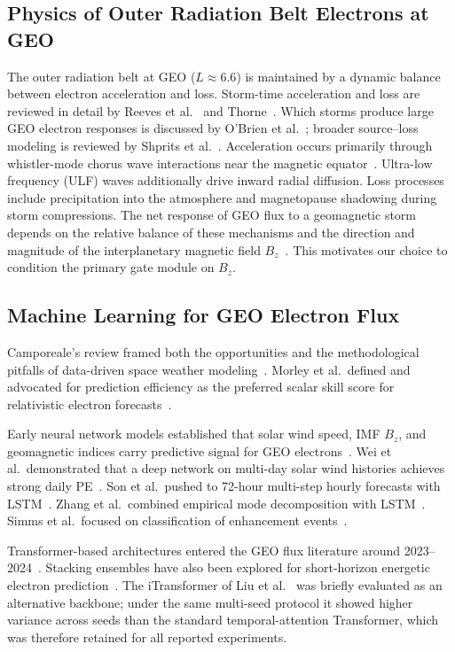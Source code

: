 ﻿\documentclass{ieeeaccess}
\begin{document}
\subsection{Physics of Outer Radiation Belt Electrons at GEO}
The outer radiation belt at GEO (\(L\approx6.6\)) is maintained by a dynamic
balance between electron acceleration and loss. Storm-time acceleration and loss
are reviewed in detail by Reeves et al.~\cite{b17} and Thorne~\cite{b18}. Which
storms produce large GEO electron responses is discussed by O'Brien et
al.~\cite{b19}; broader source--loss modeling is reviewed by Shprits et
al.~\cite{b20}. Acceleration occurs primarily through whistler-mode chorus wave
interactions near the magnetic equator~\cite{b2,b3,b6}. Ultra-low frequency (ULF)
waves additionally drive inward radial diffusion. Loss processes include
precipitation into the atmosphere and magnetopause shadowing during storm
compressions. The net response of GEO flux to a geomagnetic storm depends on the
relative balance of these mechanisms and the direction and magnitude of the
interplanetary magnetic field \(B_z\)~\cite{b2}. This motivates our choice to
condition the primary gate module on \(B_z\).

\subsection{Machine Learning for GEO Electron Flux}
Camporeale's review framed both the opportunities and the methodological pitfalls
of data-driven space weather modeling~\cite{b21}. Morley et al.\ defined and
advocated for prediction efficiency as the preferred scalar skill score for
relativistic electron forecasts~\cite{b22}.

Early neural network models established that solar wind speed, IMF \(B_z\), and
geomagnetic indices carry predictive signal for GEO electrons~\cite{b7}. Wei et
al.\ demonstrated that a deep network on multi-day solar wind histories achieves
strong daily PE~\cite{b8}. Son et al.\ pushed to 72-hour multi-step hourly
forecasts with LSTM~\cite{b9}. Zhang et al.\ combined empirical mode decomposition
with LSTM~\cite{b10}. Simms et al.\ focused on classification of enhancement
events~\cite{b11}.

Transformer-based architectures entered the GEO flux literature around
2023--2024~\cite{b14,b15,b16}. Stacking ensembles have also been explored for
short-horizon energetic electron prediction~\cite{b23}. The iTransformer of Liu
et al.~\cite{b24} was briefly evaluated as an alternative backbone; under the same
multi-seed protocol it showed higher variance across seeds than the standard
temporal-attention Transformer, which was therefore retained for all reported
experiments.
\end{document}
